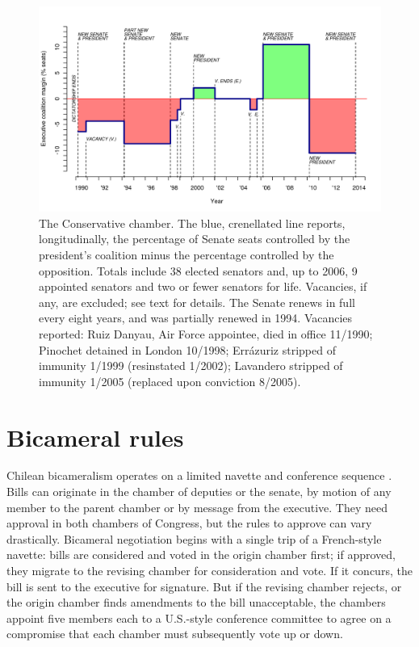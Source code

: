\documentclass[letter,12pt]{article}
\begin{document}
\begin{figure}
\begin{center}
    \includegraphics[width=\columnwidth]{../graphs/senChile.pdf}
  \caption{The Conservative chamber. The blue, crenellated line reports, longitudinally, the percentage of Senate seats controlled by the president's coalition minus the percentage controlled by the opposition. Totals include 38 elected senators and, up to 2006, 9 appointed senators and two or fewer senators for life. Vacancies, if any, are excluded; see text for details. The Senate renews in full every eight years, and was partially renewed in 1994. Vacancies reported: Ruiz Danyau, Air Force appointee, died in office 11/1990; Pinochet detained in London 10/1998; Errázuriz stripped of immunity 1/1999 (resinstated 1/2002); Lavandero stripped of immunity 1/2005 (replaced upon conviction 8/2005). }\label{f:senChile}
\end{center}
\end{figure}

\section{Bicameral rules}

Chilean bicameralism operates on a limited navette and conference sequence \citep{tsebelis.money.1997,londregan.2000a}. Bills can originate in the chamber of deputies or the senate, by motion of any member to the parent chamber or by message from the executive. They need approval in both chambers of Congress, but the rules to approve can vary drastically. Bicameral negotiation begins with a single trip of a French-style navette: bills are considered and voted in the origin chamber first; if approved, they migrate to the revising chamber for consideration and vote. If it concurs, the bill is sent to the executive for signature. But if the revising chamber rejects, or the origin chamber finds amendments to the bill unacceptable, the chambers appoint five members each to a U.S.-style conference committee to agree on a compromise that each chamber must subsequently vote up or down. 
\end{document}
